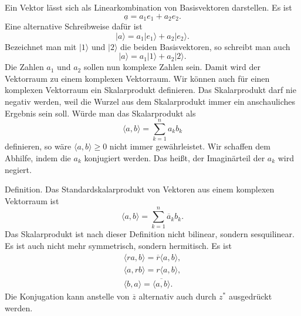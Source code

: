 \documentclass[a4paper,10pt,fleqn,twocolumn,twoside]{article}
\numberwithin{equation}{section}
\begin{document}
Ein Vektor lässt sich als Linearkombination von Basisvektoren
darstellen. Es ist
\begin{equation}
\underline a = a_1e_1+a_2e_2.
\end{equation}
Eine alternative Schreibweise dafür ist
\begin{equation}
|a\rangle = a_1|e_1\rangle+a_2|e_2\rangle.
\end{equation}
Bezeichnet man mit $|1\rangle$ und $|2\rangle$ die beiden
Basisvektoren, so schreibt man auch
\begin{equation}
|a\rangle = a_1|1\rangle+a_2|2\rangle.
\end{equation}
Die Zahlen $a_1$ und $a_2$ sollen nun komplexe Zahlen sein.
Damit wird der Vektorraum zu einem komplexen Vektorraum. Wir können
auch für einen komplexen Vektorraum ein Skalarprodukt definieren.
Das Skalarprodukt darf nie negativ werden, weil die Wurzel aus dem
Skalarprodukt immer ein anschauliches Ergebnis sein soll. Würde man
das Skalarprodukt als
\begin{equation}
\langle a,b\rangle = \sum_{k=1}^n a_kb_k
\end{equation}
definieren, so wäre $\langle a,b\rangle\geq 0$ nicht immer
gewährleistet. Wir schaffen dem Abhilfe, indem die $a_k$ konjugiert
werden. Das heißt, der Imaginärteil der $a_k$ wird negiert.

Definition. Das Standardskalarprodukt von Vektoren aus einem komplexen
Vektorraum ist
\begin{equation}
\langle a,b\rangle = \sum_{k=1}^n \overline a_kb_k.
\end{equation}
Das Skalarprodukt ist nach dieser Definition nicht bilinear, sondern
sesquilinear. Es ist auch nicht mehr symmetrisch, sondern hermitisch.
Es ist
\begin{gather}
\langle ra,b\rangle = \overline r\langle a,b\rangle,\\
\langle a,rb\rangle = r\langle a,b\rangle,\\
\langle b,a\rangle = \overline{\langle a,b\rangle}.
\end{gather}
Die Konjugation kann anstelle von $\overline z$ alternativ auch
durch $z^\ast$ ausgedrückt werden.
\end{document}
